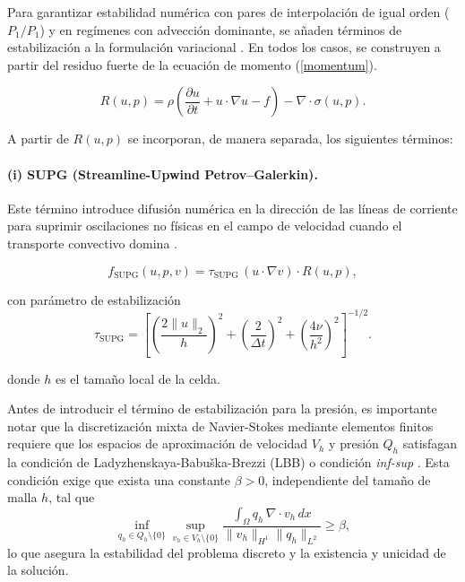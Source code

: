 \documentclass[12pt, letterpaper]{article}
\begin{document}
Para garantizar estabilidad numérica con pares de interpolación de igual orden ($P_1/P_1$) y en regímenes con advección dominante, se añaden términos de estabilización a la formulación variacional \cite{pspg, supg, lsic, leborgne_inf-sup_2023}. En todos los casos, se construyen a partir del residuo fuerte de la ecuación de momento (\ref{momentum}). 

\begin{equation}
  \label{eq:strong_residual}
  R(u, p)
  = \rho\left(\frac{\partial u}{\partial t} + u \cdot \nabla u - f\right) - \nabla \cdot \sigma(u,p).
\end{equation}

\noindent A partir de $R(u,p)$ se incorporan, de manera separada, los siguientes términos:

\paragraph{(i) SUPG (Streamline-Upwind Petrov--Galerkin).}
Este término introduce difusión numérica en la dirección de las líneas de corriente para suprimir oscilaciones no físicas en el campo de velocidad cuando el transporte convectivo domina \cite{supg}.

\begin{equation}
  \label{eq:supg_term}
  f_{\mathrm{SUPG}}(u,p,v)
  = \tau_{\mathrm{SUPG}}\, (u \cdot \nabla v) \cdot R(u, p),
\end{equation}

\noindent con parámetro de estabilización
\begin{equation}
  \label{eq:tau_supg}
  \tau_{\mathrm{SUPG}}
  = \left[ \left( \frac{2\|u\|_2}{h} \right)^2 + \left( \frac{2}{\Delta t} \right)^2 + \left( \frac{4\nu}{h^2} \right)^2 \right]^{-1/2}.
\end{equation}

\noindent donde $h$ es el tamaño local de la celda.

Antes de introducir el término de estabilización para la presión, es importante notar que la discretización mixta de Navier-Stokes mediante elementos finitos requiere que los espacios de aproximación de velocidad $V_h$ y presión $Q_h$ satisfagan la condición de Ladyzhenskaya-Babuška-Brezzi (LBB) o condición \textit{inf-sup} \cite{leborgne_inf-sup_2023}. Esta condición exige que exista una constante $\beta > 0$, independiente del tamaño de malla $h$, tal que
\[
\inf_{q_h \in Q_h \setminus \{0\}} \sup_{v_h \in V_h \setminus \{0\}} \frac{\int_\Omega q_h \,\nabla \cdot v_h \, dx}{\|v_h\|_{H^1} \|q_h\|_{L^2}} \ge \beta,
\]
lo que asegura la estabilidad del problema discreto y la existencia y unicidad de la solución.
\end{document}
